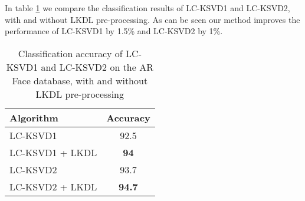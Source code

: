 \documentclass[journal]{IEEEtran}
\begin{document}
In table \ref{table:LCKSVD AR_performance} we compare the classification results of LC-KSVD1 and LC-KSVD2, with and without LKDL pre-processing. As can be seen our method improves the performance of LC-KSVD1 by 1.5\% and LC-KSVD2 by 1\%.

\begin{table}[!t]
\caption{Classification accuracy of LC-KSVD1 and LC-KSVD2 on the AR Face database, with and without LKDL pre-processing}
\label{table:LCKSVD AR_performance}
\centering
\begin{tabular}{||l||c||}
\multicolumn{1}{l}{\bf Algorithm}  &\multicolumn{1}{c}{\bf Accuracy} \\
\hline
LC-KSVD1 & 92.5 \\
\hline
LC-KSVD1 + LKDL  & \textbf{94} \\
\hline
\hline
LC-KSVD2 & 93.7 \\
\hline
LC-KSVD2 + LKDL  & \textbf{94.7} \\
\hline
\end{tabular}
\end{table}

%
%

\end{document}
